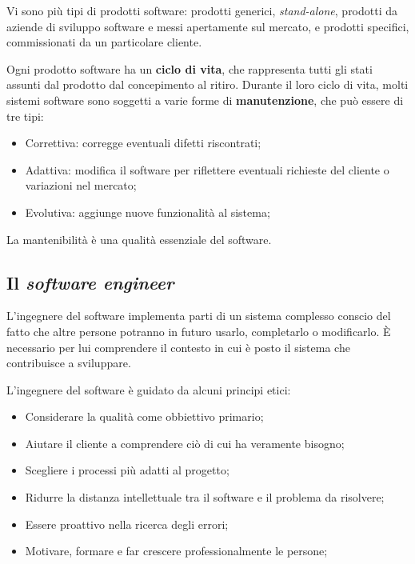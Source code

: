 \documentclass[10pt,a4paper]{article}
\newcommand{\strong}[1]{\textbf{#1}}
\newcommand{\frgnword}[1]{\textit{#1}}
\begin{document}
Vi sono più tipi di prodotti software: prodotti generici, \frgnword{stand-alone}, prodotti da aziende di sviluppo software e messi apertamente sul mercato, e prodotti specifici, commissionati da un particolare cliente.

Ogni prodotto software ha un \strong{\gls{ciclo di vita}}, che rappresenta tutti gli stati assunti dal prodotto dal concepimento al ritiro. Durante il loro ciclo di vita, molti sistemi software sono soggetti a varie forme di \strong{manutenzione}, che può essere di tre tipi: 

\begin{itemize}
	\item Correttiva: corregge eventuali difetti riscontrati;
	\item Adattiva: modifica il software per riflettere eventuali richieste del cliente o variazioni nel mercato;
	\item Evolutiva: aggiunge nuove funzionalità al sistema;
\end{itemize}

La mantenibilità è una qualità essenziale del software.

\subsection{Il \frgnword{software engineer}}
L'ingegnere del software implementa parti di un sistema complesso conscio del fatto che altre persone potranno in futuro usarlo, completarlo o modificarlo. È necessario per lui comprendere il contesto in cui è posto il sistema che contribuisce a sviluppare.

L'ingegnere del software è guidato da alcuni principi etici:
\begin{itemize}
	\item Considerare la qualità come obbiettivo primario;
	\item Aiutare il cliente a comprendere ciò di cui ha veramente bisogno;
	\item Scegliere i processi più adatti al progetto;
	\item Ridurre la distanza intellettuale tra il software e il problema da risolvere;
	\item Essere proattivo nella ricerca degli errori;
	\item Motivare, formare e far crescere professionalmente le persone;
\end{itemize}

\end{document}
